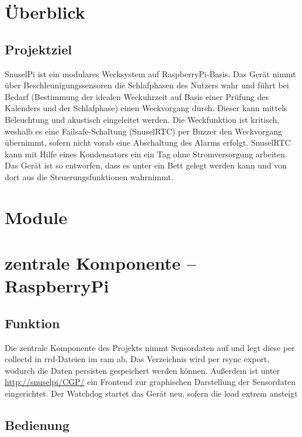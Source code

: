 \documentclass[a4paper,twoside,titlepage,normalheadings,tocleft,bibtotoc]{scrartcl}
\begin{document}
%
\tableofcontents
\newpage


\section{Überblick}
\subsection{Projektziel}

SnuselPi ist ein modulares Wecksystem auf RaspberryPi-Basis. Das Gerät nimmt
über Beschleunigungssensoren die Schlafphasen des Nutzers wahr und führt bei
Bedarf (Bestimmung der idealen Weckuhrzeit auf Basis einer Prüfung des
Kalenders und der Schlafphase) einen Weckvorgang durch. Dieser kann mittels
Beleuchtung und akustisch eingeleitet werden. Die Weckfunktion ist kritisch,
weshalb es eine Failsafe-Schaltung (SnuselRTC) per Buzzer den Weckvorgang
übernimmt, sofern nicht vorab eine Abschaltung des Alarms erfolgt. SnuselRTC
kann mit Hilfe eines Kondensators ein ein Tag ohne Stromversorgung arbeiten.
Das Gerät ist so entworfen, dass es unter ein Bett gelegt werden kann und von
dort aus die Steuerungsfunktionen wahrnimmt.

\section{Module}
\section{zentrale Komponente -- RaspberryPi}
\subsection{Funktion}

Die zentrale Komponente des Projekts nimmt Sensordaten auf und legt diese per
collectd in rrd-Dateien im ram ab. Das Verzeichnis wird per rsync export,
wodurch die Daten persisten gespeichert werden können. Außerdem ist unter
\url{http://snuselpi/CGP/} ein Frontend zur graphischen Darstellung der
Sensordaten eingerichtet. Der Watchdog startet das Gerät neu, sofern die load
extrem ansteigt

 
\subsection{Bedienung}
\end{document}
